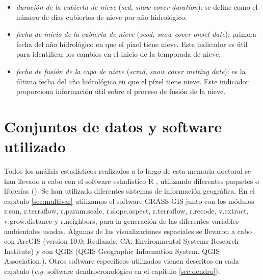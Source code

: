 \begin{itemize}
\item \emph{duración de la cubierta de
nieve} (\emph{scd}, \emph{snow cover duration}): se define como el número de días cubiertos de nieve por año hidrológico.
\item \emph{fecha de inicio de la cubierta de nieve} (\emph{scod}, \emph{snow cover onset date}): primera fecha del año hidrológico en que el píxel tiene nieve. Este indicador es útil para identificar los cambios en el inicio de la temporada de nieve.
\item \emph{fecha de fusión de la capa de nieve} (\emph{scmd}, \emph{snow cover melting date}): es la última fecha del año hidrológico en que el píxel tiene nieve. Este indicador proporciona información útil sobre el proceso de fusión de la nieve.
\end{itemize} 

\section{Conjuntos de datos y software utilizado}\label{sec:metodologia:datos}

Todos los análisis estadísticos realizados a lo largo de esta memoria doctoral se han llevado a cabo con el software estadístico R \autocite{base}, utilizando diferentes paquetes o librerías (). Se han utilizado diferentes sistemas de información geográfica. En el capítulo \ref{sec:multivar} utilizamos el software GRASS GIS \autocite{Neteleretal2012GRASSGIS} junto con los módulos r.sun, r.terraflow, r.param.scale, r.slope.aspect, r.terraflow, r.recode, v.extract, v.grow.distance y r.neighbors, para la generación de las diferentes variables ambientales usadas. Algunas de las visualizaciones espaciales se llevaron a cabo con ArcGIS (version 10.0; Redlands, CA: Environmental Systems Research Institute) y con QGIS (QGIS Geographic Information System. QGIS Association.). Otros software específicos utilizados vienen descritos en cada capítulo (\emph{e.g.} software dendrocronológico en el capítulo \ref{sec:dendro}). 


